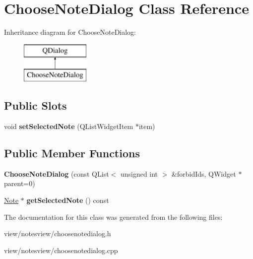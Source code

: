 \hypertarget{class_choose_note_dialog}{\section{Choose\-Note\-Dialog Class Reference}
\label{class_choose_note_dialog}
}
Inheritance diagram for Choose\-Note\-Dialog\-:\begin{figure}[H]
\begin{center}
\leavevmode
\includegraphics[height=2.000000cm]{class_choose_note_dialog}
\end{center}
\end{figure}
\subsection*{Public Slots}
\begin{DoxyCompactItemize}
\item 
\hypertarget{class_choose_note_dialog_a7526969b1a596f7d679cc8f8c400b92f}{void {\bfseries set\-Selected\-Note} (Q\-List\-Widget\-Item $\ast$item)}\label{class_choose_note_dialog_a7526969b1a596f7d679cc8f8c400b92f}

\end{DoxyCompactItemize}
\subsection*{Public Member Functions}
\begin{DoxyCompactItemize}
\item 
\hypertarget{class_choose_note_dialog_a4613af6a3fdcb66e2abfef063b678d62}{{\bfseries Choose\-Note\-Dialog} (const Q\-List$<$ unsigned int $>$ \&forbid\-Ids, Q\-Widget $\ast$parent=0)}\label{class_choose_note_dialog_a4613af6a3fdcb66e2abfef063b678d62}

\item 
\hypertarget{class_choose_note_dialog_ae84a7c1c32caf42da058e52b57eff370}{\hyperlink{class_note}{Note} $\ast$ {\bfseries get\-Selected\-Note} () const }\label{class_choose_note_dialog_ae84a7c1c32caf42da058e52b57eff370}

\end{DoxyCompactItemize}


The documentation for this class was generated from the following files\-:\begin{DoxyCompactItemize}
\item 
view/notesview/choosenotedialog.\-h\item 
view/notesview/choosenotedialog.\-cpp\end{DoxyCompactItemize}
